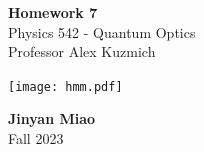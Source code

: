 \documentclass[11pt, oneside]{book}
\theoremstyle{break}
\theoremstyle{break}
\begin{document}
	\begin{titlepage}
		\begin{center}
			\vspace*{0.5cm}
			\Huge \color{red}
				\textbf{Homework 7}\\
			\vspace{0.5cm}			
			\Large \color{black}
			Physics 542 - Quantum Optics\\
			Professor Alex Kuzmich
			\vspace{1.5cm}

			\texttt{[image: hmm.pdf]}
			
			
			\vspace{2cm}
			\LARGE
				\textbf{Jinyan Miao}\\
				\hfill\break
				\LARGE Fall 2023\\
			\vspace{1cm}

		\vspace*{\fill}
		\end{center}			
	\end{titlepage}
\end{document}
